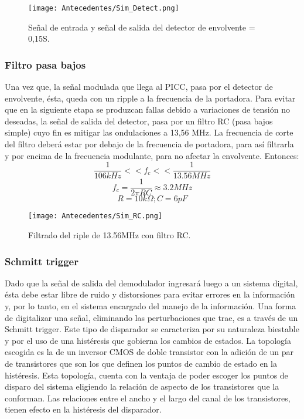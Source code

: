 \begin{figure}[H]
\centering
\texttt{[image: Antecedentes/Sim\_Detect.png]}
\caption{Señal de entrada y señal de salida del detector de envolvente \tau = 0,15\mu S.}
\label{fig:Sim_detect}
\end{figure}

\subsubsection{Filtro pasa bajos}
Una vez que, la señal modulada que llega al
PICC, pasa por el detector de envolvente, ésta,
queda con un ripple a la frecuencia de la portadora.
Para evitar que en la siguiente etapa se
produzcan fallas debido a variaciones de tensión
no deseadas, la señal de salida del detector,
pasa por un filtro RC (pasa bajos simple) cuyo
fin es mitigar las ondulaciones a 13,56 MHz.
La frecuencia de corte del filtro deberá estar por
debajo de la frecuencia de portadora, para así
filtrarla y por encima de la frecuencia modulante,
para no afectar la envolvente. Entonces:
$$\frac{1}{106kHz}<<f_c<<\frac{1}{13.56MHz}$$
$$f_c = \frac{1}{2\pi RC} \approx 3.2MHz$$
$$R = 10 k\Omega ; C = 6 pF$$

\begin{figure}[H]
\centering
\texttt{[image: Antecedentes/Sim\_RC.png]}
\caption{Filtrado del riple de 13.56MHz con filtro RC.}
\label{fig:Sim_RC}
\end{figure}

\subsubsection{Schmitt trigger}
Dado que la señal de salida del demodulador
ingresará luego a un sistema digital, ésta debe
estar libre de ruido y distorsiones para evitar
errores en la información y, por lo tanto, en el
sistema encargado del manejo de la información.
Una forma de digitalizar una señal, eliminando
las perturbaciones que trae, es a través
de un Schmitt trigger.
Este tipo de disparador se caracteriza por su
naturaleza biestable y por el uso de una histéresis
que gobierna los cambios de estados. La
topología escogida es la de un inversor CMOS
de doble transistor con la adición de un par de
transistores que son los que definen los puntos
de cambio de estado en la histéresis.
Esta topología, cuenta con la ventaja de poder
escoger los puntos de disparo del sistema eligiendo
la relación de aspecto de los transistores que la conforman. 
Las relaciones entre el ancho
y el largo del canal de los transistores, tienen
efecto en la histéresis del disparador.

